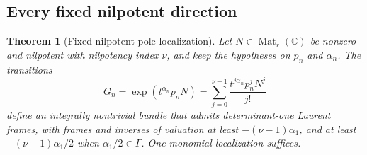 \documentclass[11pt,letterpaper]{article}
\newtheorem{theorem}{Theorem}[section]
\theoremstyle{definition}
\theoremstyle{remark}
\newcommand{\C}{\mathbb C}
\newcommand{\Mat}{\operatorname{Mat}}
\numberwithin{equation}{section}
\begin{document}
\subsection{Every fixed nilpotent direction}

\begin{theorem}[Fixed-nilpotent pole localization]\label{nab:pl:thm:nilpotent}
Let $N\in\Mat_r(\C)$ be nonzero and nilpotent with nilpotency index $\nu$, and
keep the hypotheses on $p_n$ and $\alpha_n$. The transitions
\begin{equation}\label{nab:pl:eq:nilpotentG}
 G_n=\exp(t^{\alpha_n}p_nN)=\sum_{j=0}^{\nu-1}\frac{t^{j\alpha_n}p_n^jN^j}{j!}
\end{equation}
define an integrally nontrivial bundle that admits determinant-one Laurent
frames, with frames and inverses of valuation at least $-(\nu-1)\alpha_1$, and
at least $-(\nu-1)\alpha_1/2$ when $\alpha_1/2\in\Gamma$. One monomial
localization suffices.
\end{theorem}
\end{document}
